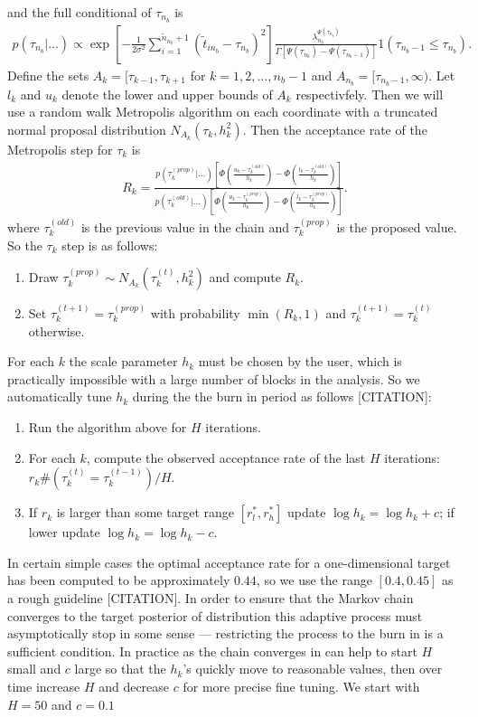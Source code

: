 \documentclass{article}
\begin{document}
and the full conditional of $\tau_{n_b}$ is
\begin{align*}
p(\tau_{n_b}|...) \propto \exp\left[-\frac{1}{2\sigma^2}\sum_{i=1}^{\tilde{n}_{n_b} + 1}(\tilde{t}_{in_b} - \tau_{n_b})^2\right] \frac{\lambda_{n_b}^{\Psi(\tau_{n_b})}}{\Gamma\left[\Psi(\tau_{n_b}) - \Psi(\tau_{n_b-1})\right]}1(\tau_{n_b-1}\le \tau_{n_b}).
\end{align*}
Define the sets $A_k = [\tau_{k-1}, \tau_{k+1}$ for $k = 1, 2, \dots, n_b-1$ and $A_{n_b} = [\tau_{n_b -1}, \infty)$. Let $l_k$ and $u_k$ denote the lower and upper bounds of $A_k$ respectivfely. Then we will use a random walk Metropolis algorithm on each coordinate with a truncated normal proposal distribution $N_{A_k}(\tau_k, h_k^2)$. Then the acceptance rate of the Metropolis step for $\tau_k$ is
\begin{align*}
R_k = \frac{p(\tau_k^{(prop)}|\dots)\left[\Phi\left(\frac{u_k - \tau_k^{(old)}}{h_k}\right) - \Phi\left(\frac{l_k - \tau_k^{(old)}}{h_k}\right)\right]}{p(\tau_k^{(old)}|\dots)\left[\Phi\left(\frac{u_k - \tau_k^{(prop)}}{h_k}\right) - \Phi\left(\frac{l_k - \tau_k^{(prop)}}{h_k}\right)\right]}.
\end{align*}
where $\tau_k^{(old)}$ is the previous value in the chain and $\tau_k^{(prop)}$ is the proposed value. So the $\tau_k$ step is as follows:
\begin{enumerate}
\item Draw $\tau_k^{(prop)} \sim N_{A_k}(\tau_k^{(t)},h_k^2)$ and compute $R_k$.
\item Set $\tau_k^{(t+1)} = \tau_k^{(prop)}$ with probability $\min(R_k, 1)$ and $\tau_k^{(t+1)} = \tau_k^{(t)}$ otherwise.
\end{enumerate}
For each $k$ the scale parameter $h_k$ must be chosen by the user, which is practically impossible with a large number of blocks in the analysis. So we automatically tune $h_k$ during the the burn in period as follows [CITATION]:
\begin{enumerate}
\item Run the algorithm above for $H$ iterations.
\item For each $k$, compute the observed acceptance rate of the last $H$ iterations: $r_k\#(\tau_k^{(t)} = \tau_k^{(t-1)})/H$.
\item If $r_k$ is larger than some target range $[r_l^*, r_h^*]$ update $\log h_k = \log h_k + c$; if lower update $\log h_k = \log h_k - c$.
\end{enumerate}
In certain simple cases the optimal acceptance rate for a one-dimensional target has been computed to be approximately $0.44$, so we use the range $[0.4, 0.45]$ as a rough guideline [CITATION]. In order to ensure that the Markov chain converges to the target posterior of distribution this adaptive process must asymptotically stop in some sense --- restricting the process to the burn in is a sufficient condition. In practice as the chain converges in can help to start $H$ small and $c$ large so that the $h_k$'s quickly move to reasonable values, then over time increase $H$ and decrease $c$ for more precise fine tuning. We start with $H=50$ and $c=0.1$
\end{document}
